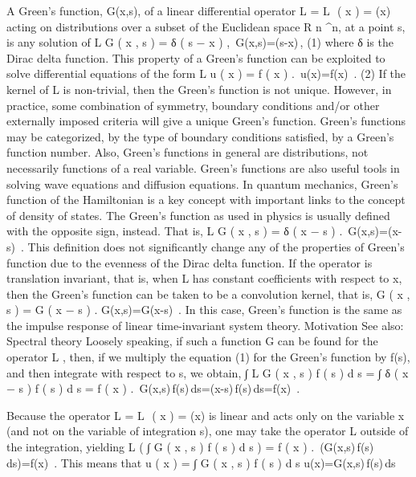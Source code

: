 A Green's function, G(x,s), of a linear differential operator L = L ⁡ ( x ) {\displaystyle {} = (x)} acting on distributions over a subset of the Euclidean space R n  ^{n}, at a point s, is any solution of
L G ( x , s ) = δ ( s − x ) ,
{\displaystyle {} \,G(x,s)=\delta (s-x)\,,}
(1)
where δ is the Dirac delta function. This property of a Green's function can be exploited to solve differential equations of the form
L u ( x ) = f ( x )   .
    {\displaystyle {} \,u(x)=f(x)~.}
(2)
If the kernel of L is non-trivial, then the Green's function is not unique. However, in practice, some combination of symmetry, boundary conditions and/or other externally imposed criteria will give a unique Green's function. Green's functions may be categorized, by the type of boundary conditions satisfied, by a Green's function number. Also, Green's functions in general are distributions, not necessarily functions of a real variable.
Green's functions are also useful tools in solving wave equations and diffusion equations. In quantum mechanics, Green's function of the Hamiltonian is a key concept with important links to the concept of density of states.
The Green's function as used in physics is usually defined with the opposite sign, instead. That is,
L G ( x , s ) = δ ( x − s )   .
    {\displaystyle {} \,G(x,s)=\delta (x-s)~.}
This definition does not significantly change any of the properties of Green's function due to the evenness of the Dirac delta function.
If the operator is translation invariant, that is, when L {\displaystyle {} } has constant coefficients with respect to x, then the Green's function can be taken to be a convolution kernel, that is,
G ( x , s ) = G ( x − s )   .
    {\displaystyle G(x,s)=G(x-s)~.}
In this case, Green's function is the same as the impulse response of linear time-invariant system theory.
Motivation
See also: Spectral theory
Loosely speaking, if such a function G can be found for the operator L {\displaystyle {} }, then, if we multiply the equation (1) for the Green's function by f(s), and then integrate with respect to s, we obtain,
∫ L G ( x , s ) f ( s ) d s = ∫ δ ( x − s ) f ( s ) d s = f ( x )   .
    {\displaystyle \int {} \,G(x,s)\,f(s)\,ds=\int \delta (x-s)\,f(s)\,ds=f(x)~.}

Because the operator L = L ⁡ ( x ) {\displaystyle {} = (x)} is linear and acts only on the variable x (and not on the variable of integration s), one may take the operator L {\displaystyle {} } outside of the integration, yielding
L ( ∫ G ( x , s ) f ( s ) d s ) = f ( x )   .
    {\displaystyle {} \,\left(\int G(x,s)\,f(s)\,ds\right)=f(x)~.}
This means that
u ( x ) = ∫ G ( x , s ) f ( s ) d s
    {\displaystyle u(x)=\int G(x,s)\,f(s)\,ds}













